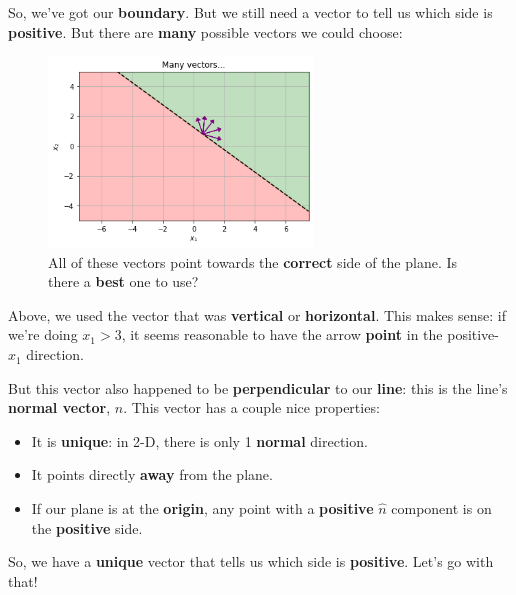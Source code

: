         So, we've got our \textbf{boundary}. But we still need a vector to tell us which side is \textbf{positive}. But there are \textbf{many} possible vectors we could choose:
        
        \begin{figure}[H]
            \centering
                \includegraphics[width=70mm,scale=0.5]{images/classification_images/many_vectors_for_a_plane.png}
                
                \caption*{All of these vectors point towards the \textbf{correct} side of the plane. Is there a \textbf{best} one to use?}
        \end{figure}
        
        Above, we used the vector that was \textbf{vertical} or \textbf{horizontal}. This makes sense: if we're doing $x_1>3$, it seems reasonable to have the arrow \textbf{point} in the positive-$x_1$ direction.
        
        But this vector also happened to be \textbf{perpendicular} to our \textbf{line}: this is the line's \textbf{normal vector}, $\hat{n}$. This vector has a couple nice properties:
        
        \begin{itemize}
            \item It is \textbf{unique}: in 2-D, there is only 1 \textbf{normal} direction.
                
            \item It points directly \textbf{away} from the plane.
            
            \item If our plane is at the \textbf{origin}, any point with a \textbf{positive} $\hat{n}$ component is on the \textbf{positive} side.
        \end{itemize}
        
        So, we have a \textbf{unique} vector that tells us which side is \textbf{positive}. Let's go with that!\\
        
